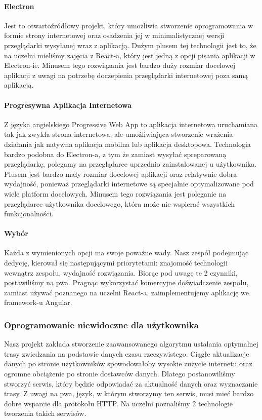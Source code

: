 \paragraph{Electron}
Jest to otwartoźródłowy projekt, który umożliwia stworzenie oprogramowania w formie strony internetowej oraz osadzenia jej w minimalistycznej wersji przeglądarki wysyłanej wraz z aplikacją.
Dużym plusem tej technologii jest to, że na uczelni mieliśmy zajęcia z React-a, który jest jedną z opcji pisania aplikacji w Electron-ie.
Minusem tego rozwiązania jest bardzo duży rozmiar docelowej aplikacji z uwagi na potrzebę doczepienia przeglądarki internetowej poza samą aplikacją.

\paragraph{Progresywna Aplikacja Internetowa}
Z języka angielskiego Progressive Web App to aplikacja internetowa uruchamiana tak jak zwykła strona internetowa, ale umożliwiająca stworzenie wrażenia działania jak natywna aplikacja mobilna lub aplikacja desktopowa.
Technologia bardzo podobna do Electron-a, z tym że zamiast wysyłać spreparowaną przeglądarkę, polegamy na przeglądarce uprzednio zainstalowanej u użytkownika.
Plusem jest bardzo mały rozmiar docelowej aplikacji oraz relatywnie dobra wydajność, ponieważ przeglądarki internetowe są specjalnie optymalizowane pod wiele platform docelowych.
Minusem tego rozwiązania jest poleganie na przeglądarce użytkownika docelowego, która może nie wspierać wszystkich funkcjonalności.

\paragraph{Wybór}
Każda z wymienionych opcji ma swoje poważne wady.
Nasz zespół podejmując dedycję, kierował się następującymi priorytetami: znajomość technologii wewnątrz zespołu, wydajność rozwiązania.
Biorąc pod uwagę te 2 czynniki, postawiliśmy na \acrshort{pwa}\@.
Pragnąc wykorzystać komercyjne doświadczenie zespołu, zamiast używać poznanego na uczelni React-a, zaimplementujemy aplikację we framework-u Angular.

\subsubsection{Oprogramowanie niewidoczne dla użytkownika}
Nasz projekt zakłada stworzenie zaawansowanego algorytmu ustalania optymalnej trasy zwiedzania na podstawie danych czasu rzeczywistego.
Ciągłe aktualizacje danych po stronie użytkowników spowodowałoby wysokie zużycie internetu oraz ogromne obciążenie po stronie dostawców danych.
Dlatego postanowiliśmy stworzyć serwis, który będzie odpowiadać za aktualność danych oraz wyznaczanie trasy.
Z uwagi na \acrshort{pwa}, język, w którym stworzymy ten serwis, musi mieć bardzo dobre wsparcie dla protokołu HTTP\@.
Na uczelni poznaliśmy 2 technologie tworzenia takich serwisów.

